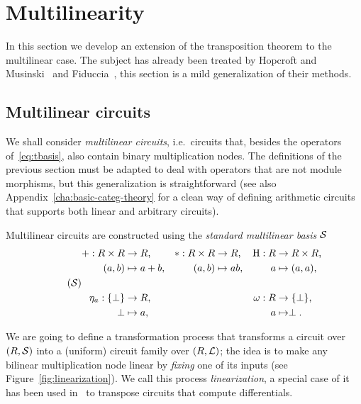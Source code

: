 

\section{Multilinearity}
\label{sec:multi}

In this section we develop an extension of the transposition theorem
to the multilinear case.  The subject has already been treated by
Hopcroft and Musinski~\cite{hopcroft+musinski73} and
Fiduccia~\cite{fiduccia:phd}, this section is a mild generalization of
their methods.

\subsection{Multilinear circuits}
\label{sec:multilinear-circuits}
We shall consider \emph{multilinear
  circuits}, i.e.\ circuits that, besides the operators
of~\ref{eq:tbasis}, also contain binary multiplication nodes. The
definitions of the previous section must be adapted to deal with
operators that are not module morphisms, but this generalization is
straightforward (see also Appendix~\ref{cha:basic-categ-theory} for a
clean way of defining arithmetic circuits that supports both linear
and arbitrary circuits).

  Multilinear circuits are constructed using
the \emph{standard multilinear
  basis} $\mathcal{S}$
\begin{equation}
  \label{eq:sbasis}
  \tag{$\Sbasis$}
  \begin{aligned}
    + : R\times R &\ra R\text{,}    & * : R\times R &\ra R\text{,} &  \hub : R &\ra R\times R\text{,}\\
      (a, b) &\mapsto a+b\text{,}   &   (a, b) &\mapsto ab\text{,} &         a &\mapsto (a,a)\text{,}\\ \\
    \eta_a : \{\bom\} &\ra R\text{,}     &&& \omega : R &\ra \{\bom\}\text{,} \\
          \bom &\mapsto a\text{,} &&&          a &\mapsto \bom\text{.}
  \end{aligned}
\end{equation}


We are going to define a transformation process that transforms a
circuit over $(R,\mathcal{S})$ into a (uniform) circuit family over
$(R,\mathcal{L})$; the idea is to make any bilinear multiplication node
linear by \emph{fixing} one of its inputs (see
Figure~\ref{fig:linearization}). We call this process
\emph{linearization}, a special case of it has been used
in~\cite{gashkov+gashkov05,sergeev08} to transpose circuits that
compute differentials.

